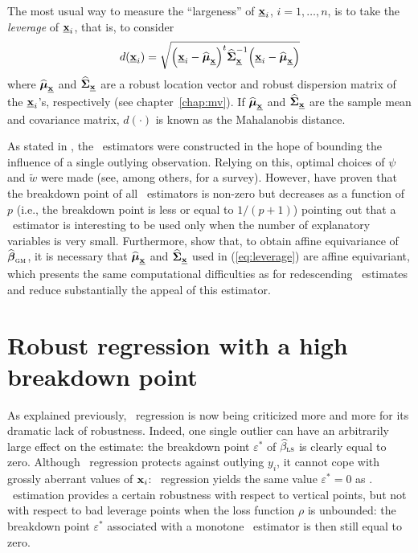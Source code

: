 The most usual way to measure the “largeness” of $\underline{\mathbf x}_i$,
$i=1, \dots, n$, is to take the \emph{leverage} of $\underline{\mathbf x}_i$,
that is, to consider
%
\begin{equation}
    \label{eq:leverage}
    d(\underline{\stvec{x}}_i) = 
    \sqrt{\left(\underline{\stvec{x}}_i - \sthat{\boldsymbol\mu}_{\underline{\stvec{x}}}\right)^t
    \sthat{\boldsymbol\Sigma}_{\underline{\stvec{x}}}^{-1}
    \left(\underline{\stvec{x}}_i - \sthat{\boldsymbol\mu}_{\underline{\stvec{x}}}\right)}
\end{equation}
%
where $\widehat{\boldsymbol\mu}_{\underline{\mathbf x}}$ and
$\widehat{\boldsymbol\Sigma}_{\underline{\mathbf x}}$ are a robust location
vector and robust dispersion matrix of the $\underline{\mathbf x}_i$'s,
respectively (see chapter~\ref{chap:mv}). If
$\widehat{\boldsymbol\mu}_{\underline{\mathbf x}}$ and
$\widehat{\boldsymbol\Sigma}_{\underline{\mathbf x}}$ are the sample mean and
covariance matrix, $d(\cdot)$ is known as the Mahalanobis distance.

As stated in \citet{rousseeuw:leroy:1987}, the ~estimators were
constructed in the hope of bounding the influence of a single outlying
observation. Relying on this, optimal choices of $\psi$ and $\widetilde{w}$
were made (see, among others, \citealp{Ronchetti:Rousseeuw:1985} for a survey).
However, \citet{Maronna:1979} have proven that the breakdown point of all
~estimators is non-zero but decreases as a function of $p$ (i.e., the
breakdown point is less or equal to $1/(p+1)$) pointing out that a
~estimator is interesting to be used only when the number of
explanatory variables is very small. Furthermore, \citet{maronna:etal:2006}
show that, to obtain affine equivariance of
$\sthat{\boldsymbol\beta}_{\stsc{GM}}$, it is necessary that
$\widehat{\boldsymbol\mu}_{\underline{\mathbf x}}$ and
$\widehat{\boldsymbol\Sigma}_{\underline{\mathbf x}}$ used in (\ref{eq:leverage})
are affine equivariant, which presents the same computational difficulties as
for redescending ~estimates and reduce substantially the appeal of this
estimator.

\section{Robust regression with a high breakdown point}

As explained previously, ~regression is now being criticized more and
more for its dramatic lack of robustness. Indeed, one single outlier can have
an arbitrarily large effect on the estimate: the breakdown point
$\varepsilon^*$ of $\sthat{\beta}_\stsc{LS}$ is clearly equal to zero.
Although ~regression protects against outlying $y_i$, it cannot
cope with grossly aberrant values of $\mathbf x_i$: ~regression
yields the same value $\varepsilon^*=0$ as . ~estimation
provides a certain robustness with respect to vertical points, but not with
respect to bad leverage points when the loss function $\rho$ is unbounded: the
breakdown point $\varepsilon^*$ associated with a monotone ~estimator
is then still equal to zero.

